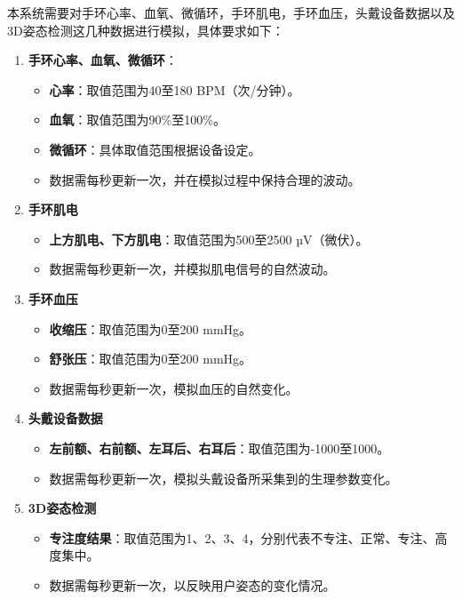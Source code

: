\documentclass[oneside]{xduugthesis}
\begin{document}
本系统需要对手环心率、血氧、微循环，手环肌电，手环血压，头戴设备数据以及3D姿态检测这几种数据进行模拟，具体要求如下：

\begin{enumerate}[nosep]
\item \textbf{手环心率、血氧、微循环}：
\begin{itemize}[nosep]
    \item \textbf{心率}：取值范围为40至180 BPM（次/分钟）。
    \item \textbf{血氧}：取值范围为90\%至100\%。
    \item \textbf{微循环}：具体取值范围根据设备设定。
    \item 数据需每秒更新一次，并在模拟过程中保持合理的波动。
\end{itemize}

\item \textbf{手环肌电}
\begin{itemize}[nosep]
    \item \textbf{上方肌电、下方肌电}：取值范围为500至2500 µV（微伏）。
    \item 数据需每秒更新一次，并模拟肌电信号的自然波动。
\end{itemize}

\item \textbf{手环血压}
\begin{itemize}[nosep]
    \item \textbf{收缩压}：取值范围为0至200 mmHg。
    \item \textbf{舒张压}：取值范围为0至200 mmHg。
    \item 数据需每秒更新一次，模拟血压的自然变化。
\end{itemize}

\item \textbf{头戴设备数据}
\begin{itemize}[nosep]
    \item \textbf{左前额、右前额、左耳后、右耳后}：取值范围为-1000至1000。
    \item 数据需每秒更新一次，模拟头戴设备所采集到的生理参数变化。
\end{itemize}

\item \textbf{3D姿态检测}
\begin{itemize}[nosep]
    \item \textbf{专注度结果}：取值范围为1、2、3、4，分别代表不专注、正常、专注、高度集中。
    \item 数据需每秒更新一次，以反映用户姿态的变化情况。
\end{itemize}
\end{enumerate}
\end{document}
